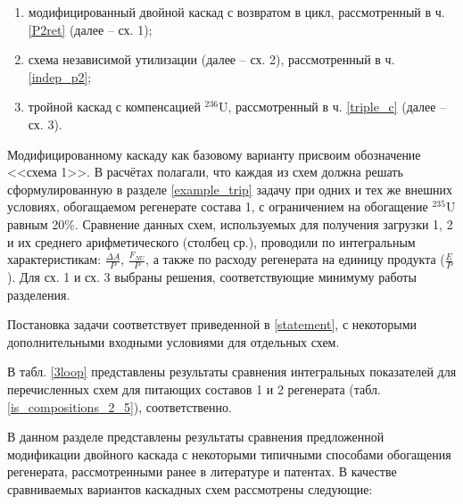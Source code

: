 \begin{enumerate}
    \item модифицированный двойной каскад с возвратом в цикл, рассмотренный в ч. \ref{P2ret} (далее -- сх. 1);
    \item схема независимой утилизации (далее -- сх. 2), рассмотренный в ч. \ref{indep_p2};
    \item тройной каскад с компенсацией $^{236}$U, рассмотренный в ч. \ref{triple_c} (далее -- сх. 3).
\end{enumerate}

Модифицированному каскаду как базовому варианту присвоим обозначение <<схема 1>>. В расчётах полагали, что каждая из схем должна решать сформулированную в разделе \ref{example_trip} задачу при одних и тех же внешних условиях, обогащаемом регенерате состава 1, с ограничением на обогащение $^{235}$U равным 20\%. Сравнение данных схем, используемых для получения загрузки 1, 2 и их среднего арифметического (столбец ср.), проводили по интегральным характеристикам: $\frac{\Delta A}{P}$, $\frac{F_{NU}}{P}$, а также по расходу регенерата на единицу продукта ($\frac{E}{P}$). Для сх. 1 и сх. 3 выбраны решения, соответствующие минимуму работы разделения.

Постановка задачи соответствует приведенной в \ref{statement}, с некоторыми дополнительными входными условиями для отдельных схем.

В табл. \ref{3loop} представлены результаты сравнения интегральных показателей для перечисленных схем для питающих составов 1 и 2 регенерата (табл. \ref{is_compositions_2_5}), соответственно.


В данном разделе представлены результаты сравнения предложенной модификации двойного каскада с некоторыми типичными способами обогащения регенерата, рассмотренными ранее в литературе и патентах. В качестве сравниваемых вариантов каскадных схем рассмотрены следующие: 

